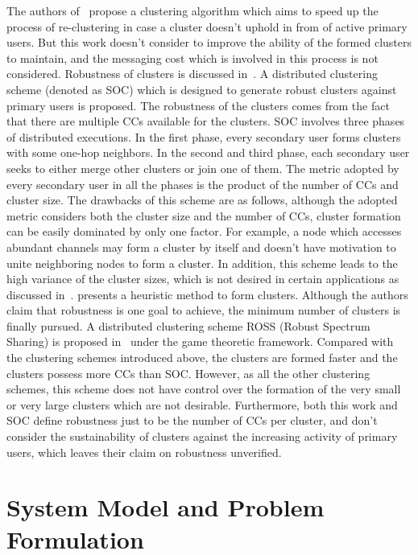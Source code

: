 \documentclass[times]{ettauth}
\theoremstyle{mytheoremstyle}
\theoremstyle{mytheoremstyle}
\theoremstyle{mytheoremstyle}
\begin{document}
The authors of~\cite{Mansoor2015} propose a clustering algorithm which aims to speed up the process of re-clustering in case a cluster doesn't uphold in from of active primary users.
But this work doesn't consider to improve the ability of the formed clusters to maintain, and the messaging cost which is involved in this process is not considered.
Robustness of clusters is discussed in~\cite{LIU_TMC11_2}. A distributed clustering scheme (denoted as SOC) which is designed to generate robust clusters against primary users is proposed.
The robustness of the clusters comes from the fact that there are multiple CCs available for the clusters.
SOC involves three phases of distributed executions.
In the first phase, every secondary user forms clusters with some one-hop neighbors. In the second and third phase, each secondary user seeks to either merge other clusters or join one of them.
The metric adopted by every secondary user in all the phases is the product of the number of CCs and cluster size.
The drawbacks of this scheme are as follows, although the adopted metric considers both the cluster size and the number of CCs, cluster formation can be easily dominated by only one factor.
For example, a node which accesses abundant channels may form a cluster by itself and doesn't have motivation to unite neighboring nodes to form a cluster.
In addition, this scheme leads to the high variance of the cluster sizes, which is not desired in certain applications as discussed in~\cite{clustering_globecom11, cluster_EW10}.
\cite{mansoor_15_cluster_robust} presents a heuristic method to form clusters. Although the authors claim that robustness is one goal to achieve, the minimum number of clusters is finally pursued.
%
A distributed clustering scheme ROSS (Robust Spectrum Sharing) is proposed in~\cite{Li11_ROSS} under the game theoretic framework. 
Compared with the clustering schemes introduced above, the clusters are formed faster and the clusters possess more CCs than SOC.
However, as all the other clustering schemes, this scheme does not have control over the formation of the very small or very large clusters which are not desirable.
Furthermore, both this work and SOC define robustness just to be the number of CCs per cluster, and don't consider the sustainability of clusters against the increasing activity of primary users, which leaves their claim on robustness unverified.
%






\section{System Model and Problem Formulation}
\label{sec:model}
\end{document}
